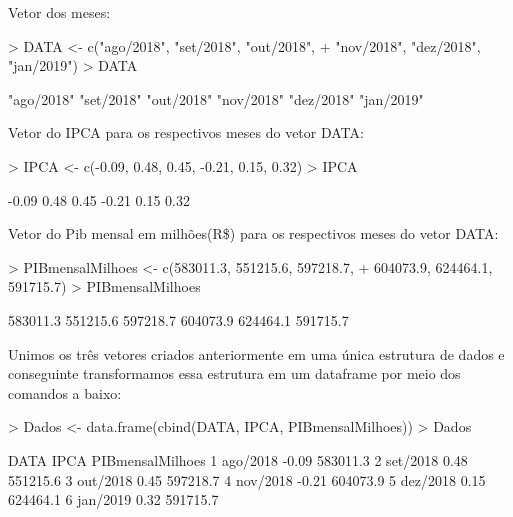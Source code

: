 \documentclass[12pt,a4paper,oneside]{erdc}
\begin{document}
Vetor dos meses:
\begin{Schunk}
\begin{Sinput}
> DATA <- c("ago/2018", "set/2018", "out/2018", 
+           "nov/2018", "dez/2018", "jan/2019")
> DATA
\end{Sinput}
\begin{Soutput}
[1] "ago/2018" "set/2018" "out/2018" "nov/2018" "dez/2018" "jan/2019"
\end{Soutput}
\end{Schunk}

Vetor do IPCA para os respectivos meses do vetor DATA:
\begin{Schunk}
\begin{Sinput}
> IPCA <- c(-0.09, 0.48, 0.45, -0.21, 0.15, 0.32)
> IPCA
\end{Sinput}
\begin{Soutput}
[1] -0.09  0.48  0.45 -0.21  0.15  0.32
\end{Soutput}
\end{Schunk}

Vetor do Pib mensal em milhões(R\$) para os respectivos meses do vetor DATA:
\begin{Schunk}
\begin{Sinput}
> PIBmensalMilhoes <- c(583011.3, 551215.6, 597218.7,
+                       604073.9, 624464.1, 591715.7)
> PIBmensalMilhoes
\end{Sinput}
\begin{Soutput}
[1] 583011.3 551215.6 597218.7 604073.9 624464.1 591715.7
\end{Soutput}
\end{Schunk}

\newpage

Unimos os três vetores criados anteriormente em uma única estrutura de dados e conseguinte transformamos essa estrutura em um dataframe por meio dos comandos a baixo:
\begin{Schunk}
\begin{Sinput}
> Dados <- data.frame(cbind(DATA, IPCA, PIBmensalMilhoes))
> Dados
\end{Sinput}
\begin{Soutput}
      DATA  IPCA PIBmensalMilhoes
1 ago/2018 -0.09         583011.3
2 set/2018  0.48         551215.6
3 out/2018  0.45         597218.7
4 nov/2018 -0.21         604073.9
5 dez/2018  0.15         624464.1
6 jan/2019  0.32         591715.7
\end{Soutput}
\end{Schunk}
\end{document}
